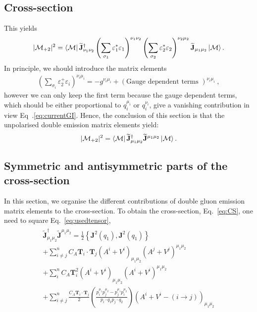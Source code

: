 \documentclass[a4paper,11pt]{article}
\numberwithin{equation}{section}
\newcommand{\bJ}{\mathbf{J}}
\newcommand{\Rp}{\right)}
\newcommand{\Lp}{\left(}
\newcommand{\ldot}{\!\cdot\!}
\newcommand{\pola}{\varepsilon}
\newcommand{\bd}[1]{\mathbf{#1}}
\begin{document}
\subsection{Cross-section}

This yields
\begin{align}
|\mathcal{M}_{+2}|^2=
\bra{\mathcal{M}}
 \widetilde{\bJ}^\dagger_{\nu_1\nu_2} 
 \Lp\sum_{\sigma_{1}}\pola_1^* \pola_1 \Rp^{\nu_1\nu_2}
\Lp \sum_{\sigma_{2}}\pola_2^* \pola_2\Rp^{\nu_2\mu_2}  \widetilde{\bJ}_{\mu_1\mu_2} 
 \ket{\mathcal{M}}. 
\end{align}
In principle, we should introduce the matrix elements 
\begin{align}
\Lp \sum_{\sigma_{i}}\pola_2^+ \pola_i\Rp^{\nu_i\mu_i}  = -g^{\nu_i\mu_i}+ (\text{Gauge dependent terms })^{\nu_i\mu_i}~,
\end{align}
however we can only keep the first term  because the gauge dependent terms, which should be either proportional to 
$q_i^{\mu_i} $ or $q_i^{\nu_i}$, give a vanishing contribution in view Eq~.\eqref{eq:currentGI}. Hence, the conclusion of this section is that the unpolarised double emission matrix elements yield: 
\begin{align}
|\mathcal{M}_{+2}|^2=
\bra{\mathcal{M}}
 \widetilde{\bJ}^\dagger_{\mu_1\mu_2}  \widetilde{\bJ}^{\mu_1\mu_2}  
 \ket{\mathcal{M}}. \label{eq:CS}
\end{align}

\subsection{Symmetric and antisymmetric parts of the cross-section}

In this section, we organise the different contributions of double gluon emission matrix elements to the 
cross-section. To obtain the cross-section, Eq.~\eqref{eq:CS}, one need to  square Eq.~\eqref{eq:usedtensor}, 
\begin{align}
\begin{gathered}
\widetilde{\bJ}^\dagger_{\mu_1\mu_2}  \widetilde{\bJ}^{\mu_1\mu_2}   
= \frac{1}{2}\left\{ \bd{J}^2(q_1), \bd{J}^2(q_1) \right\} \\
+
\sum_{i\ne  j}^n
 C_A\bd{T}_i\ldot\bd{T}_j
 \left( A^{i}+ V^{i} \right)_{\mu_1\mu_2}
\left( A^{j }+V^{j }  \right)^{\mu_1\mu_2}
 \\
+\sum_{i}^n
 C_A\bd{T}_i^2
 \left( A^{i}+ V^{i} \right)_{\mu_1\mu_2}
\left( A^{i} +V^{i} \right)^{\mu_1\mu_2} 
 \\ 
%
+ \sum_{i\ne j}^n    \frac{C_A   \bd{T}_i\ldot\bd{T}_j }{2}
\left( \frac{p_i^{\mu_1} p_j^{\mu_2} -p_j^{\mu_1} p_i^{\mu_2}  }{p_i\cdot q_1 p_j\cdot q_2}
\right) \left( A^i+  V^i
- (i\to j)\right)_{\mu_1\mu_2}
\end{gathered}
\end{align}
\end{document}
